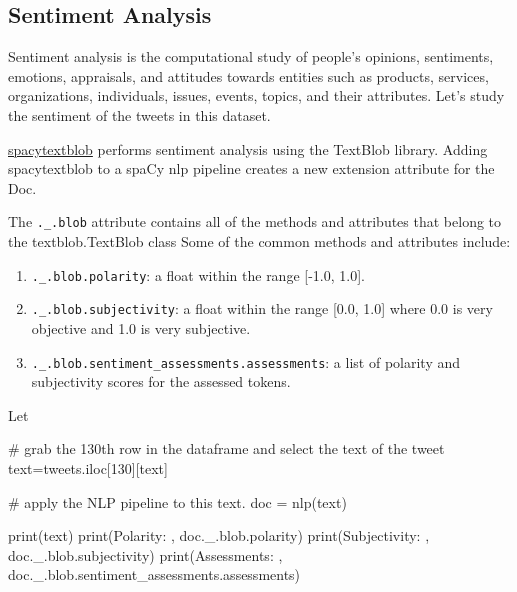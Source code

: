 \documentclass[
  letterpaper,
  DIV=11,
  numbers=noendperiod]{scrreprt}
\newenvironment{Shaded}{\begin{snugshade}}{\end{snugshade}}
\newcommand{\BuiltInTok}[1]{\textcolor[rgb]{0.00,0.23,0.31}{#1}}
\newcommand{\CommentTok}[1]{\textcolor[rgb]{0.37,0.37,0.37}{#1}}
\newcommand{\DecValTok}[1]{\textcolor[rgb]{0.68,0.00,0.00}{#1}}
\newcommand{\NormalTok}[1]{\textcolor[rgb]{0.00,0.23,0.31}{#1}}
\newcommand{\OperatorTok}[1]{\textcolor[rgb]{0.37,0.37,0.37}{#1}}
\newcommand{\StringTok}[1]{\textcolor[rgb]{0.13,0.47,0.30}{#1}}
\providecommand{\tightlist}{%
  \setlength{\itemsep}{0pt}\setlength{\parskip}{0pt}}\usepackage{longtable,booktabs,array}
\begin{document}
\hypertarget{sentiment-analysis}{%
\subsection{Sentiment Analysis}\label{sentiment-analysis}}

Sentiment analysis is the computational study of people's opinions,
sentiments, emotions, appraisals, and attitudes towards entities such as
products, services, organizations, individuals, issues, events, topics,
and their attributes. Let's study the sentiment of the tweets in this
dataset.

\href{https://spacytextblob.netlify.app/}{spacytextblob} performs
sentiment analysis using the TextBlob library. Adding spacytextblob to a
spaCy nlp pipeline creates a new extension attribute for the Doc.

The \texttt{.\_.blob} attribute contains all of the methods and
attributes that belong to the textblob.TextBlob class Some of the common
methods and attributes include:

\begin{enumerate}
\def\labelenumi{\arabic{enumi}.}
\tightlist
\item
  \texttt{.\_.blob.polarity}: a float within the range {[}-1.0, 1.0{]}.
\item
  \texttt{.\_.blob.subjectivity}: a float within the range {[}0.0,
  1.0{]} where 0.0 is very objective and 1.0 is very subjective.
\item
  \texttt{.\_.blob.sentiment\_assessments.assessments}: a list of
  polarity and subjectivity scores for the assessed tokens.
\end{enumerate}

Let

\begin{Shaded}
\begin{Highlighting}[]
\CommentTok{\# grab the 130th row in the dataframe and select the text of the tweet}
\NormalTok{text}\OperatorTok{=}\NormalTok{tweets.iloc[}\DecValTok{130}\NormalTok{][}\StringTok{\textquotesingle{}text\textquotesingle{}}\NormalTok{]}

\CommentTok{\# apply the NLP pipeline to this text.}
\NormalTok{doc }\OperatorTok{=}\NormalTok{ nlp(text)}

\BuiltInTok{print}\NormalTok{(text)}
\BuiltInTok{print}\NormalTok{(}\StringTok{\textquotesingle{}Polarity: \textquotesingle{}}\NormalTok{, doc.\_.blob.polarity)}
\BuiltInTok{print}\NormalTok{(}\StringTok{\textquotesingle{}Subjectivity: \textquotesingle{}}\NormalTok{, doc.\_.blob.subjectivity)}
\BuiltInTok{print}\NormalTok{(}\StringTok{\textquotesingle{}Assessments: \textquotesingle{}}\NormalTok{, doc.\_.blob.sentiment\_assessments.assessments)}
\end{Highlighting}
\end{Shaded}
\end{document}
